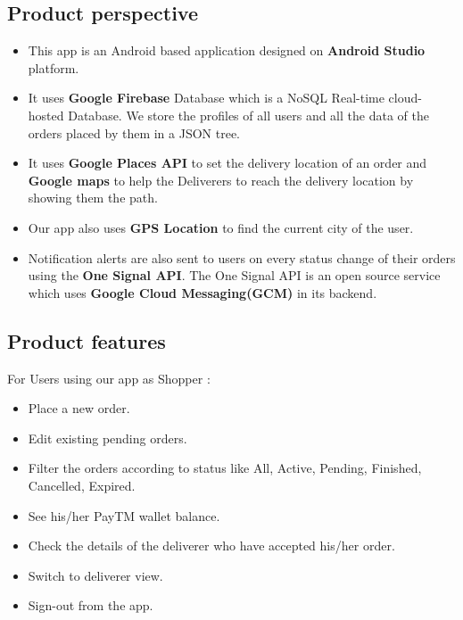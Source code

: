 \documentclass{report}
\begin{document}
\subsection{Product perspective}

\begin{itemize}[label=$\circ$]
\item This app is an Android based application designed on \textbf{Android Studio} platform.
\item It uses \textbf{Google Firebase\cite{c9}} Database which is a NoSQL Real-time cloud-hosted Database. We store the profiles of all users and all the data of the orders placed by them in a JSON tree. 
\item It uses \textbf{Google Places API} to set the delivery location of an order and \textbf{Google maps\cite{c2}} to help the Deliverers to reach the delivery location by showing them the path. 
\item Our app also uses \textbf{GPS Location} to find the current city of the user. 
\item Notification alerts are also sent to users on every status change of their orders using the \textbf{One Signal API\cite{c16}}. The One Signal API  is an open source service which uses \textbf{Google Cloud Messaging(GCM)\cite{c11}} in its backend.
\end{itemize}

\subsection{Product features}

For Users using our app as Shopper :
\begin{itemize}[label=$\circ$]
\item Place a new order.
\item Edit existing pending orders.
\item Filter the orders according to status like All, Active, Pending, Finished, Cancelled, Expired.
\item See his/her PayTM wallet balance.
\item Check the details of the deliverer who have accepted his/her order.
\item Switch to deliverer view.
\item Sign-out from the app.
\end{itemize}
\end{document}
